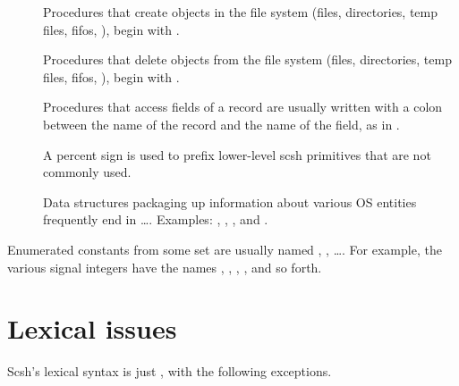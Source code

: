 \begin{description}
\item[]
        Procedures that create objects in the file system (files, directories,
        temp files, fifos, \etc), begin with .

\item []
        Procedures that delete objects from the file system (files, 
        directories, temp files, fifos, \etc), begin with .

\item[  ]
        Procedures that access fields of a record are usually written
        with a colon between the name of the record and the name of the
        field, as in .

\item[\ex{\%\ldots}]
        A percent sign is used to prefix lower-level scsh primitives
        that are not commonly used.

\item[]
        Data structures packaging up information about various OS
        entities frequently end in \ldots{}. Examples:
        , , , and .

\end{description}
%
Enumerated constants from some set  are usually named
, , \ldots.
For example, the various {\Unix} signal integers have the names
, , , , 
and so forth.

\section{Lexical issues}
Scsh's lexical syntax is just {\RnRS} {\Scheme}, with the following
exceptions.

